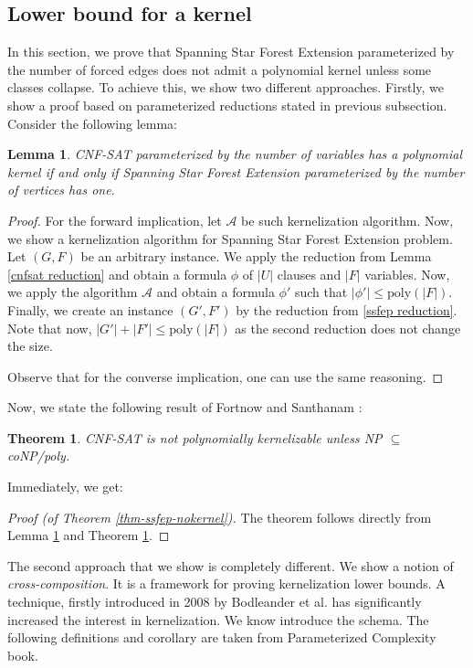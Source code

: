 \documentclass[en]{pracamgr}
\newtheorem{theorem}{Theorem}
\newtheorem{lemma}{Lemma}
\theoremstyle{definition}
\newcommand{\ssfep}{{\sc Spanning Star Forest Extension}}
\newcommand{\cnfsat}{{\sc CNF-SAT}}
\begin{document}
\subsection{Lower bound for a kernel}

In this section, we prove that \ssfep{} parameterized by the number of forced edges does not admit a polynomial kernel unless some classes collapse. To achieve this, we show two different approaches. Firstly, we show a proof based on parameterized reductions stated in previous subsection. Consider the following lemma:

\begin{lemma}\label{kernel}
	\cnfsat{} parameterized by the number of variables has a polynomial kernel if and only if \ssfep{} parameterized by the number of vertices has one.
\end{lemma}

\begin{proof}
	For the forward implication, let $\mathcal{A}$ be such kernelization algorithm. Now, we show a kernelization algorithm for \ssfep{} problem. Let $(G,F)$ be an arbitrary instance. We apply the reduction from Lemma \ref{cnfsat reduction} and obtain a formula $\phi$ of $|U|$ clauses and $|F|$ variables. Now, we apply the algorithm $\mathcal{A}$ and obtain a formula $\phi'$ such that $|\phi'| \leq \textrm{poly}(|F|)$. Finally, we create an instance $(G',F')$ by the reduction from \ref{ssfep reduction}. Note that now, $|G'|+|F'| \leq \textrm{poly}(|F|)$ as the second reduction does not change the size.
	
	Observe that for the converse implication, one can use the same reasoning.
\end{proof}

Now, we state the following result of Fortnow and Santhanam \cite{CNFSAT}:

\begin{theorem}\label{Fortnow}
	\cnfsat{} is not polynomially kernelizable unless NP $\subseteq$ coNP/poly.
\end{theorem}

Immediately, we get:

\begin{proof}[Proof (of Theorem \ref{thm-ssfep-nokernel})]
	The theorem follows directly from Lemma \ref{kernel} and Theorem \ref{Fortnow}.
\end{proof}

The second approach that we show is completely different. We show a notion of \textit{cross-composition}. It is a framework for proving kernelization lower bounds. A technique, firstly introduced in 2008 by Bodleander et al. \cite{Bodlaender} has significantly increased the interest in kernelization. We know introduce the schema. The following definitions and corollary are taken from Parameterized Complexity \cite{ParAlg} book.
\end{document}
